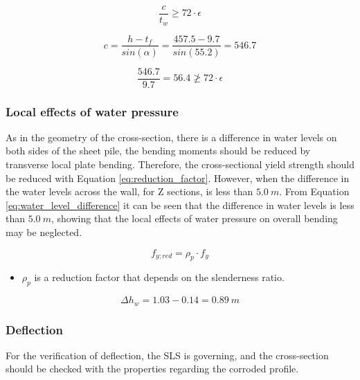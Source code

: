 \begin{equation}
    \frac{c}{t_{w}} \geq 72 \cdot \epsilon
    \label{eq:shear_buckling}
\end{equation}

\begin{equation}
    c = \frac{h - t_{f}}{sin(\alpha)} = \frac{457.5 - 9.7}{sin(55.2)} = 546.7 
\end{equation}

\begin{equation}
    \frac{546.7}{9.7} = 56.4 \ngeq 72 \cdot \epsilon 
    \label{eq:no_shear_buckling}
\end{equation}

\subsubsection{Local effects of water pressure}

As in the geometry of the cross-section, there is a difference in water levels on both sides of the sheet pile, the bending moments should be reduced by transverse local plate bending. Therefore, the cross-sectional yield strength should be reduced with Equation \ref{eq:reduction_factor}. However, when the difference in the water levels across the wall, for Z sections, is less than $5.0 \ m$. From Equation \ref{eq:water_level_difference} it can be seen that the difference in water levels is less than $5.0 \ m$, showing that the local effects of water pressure on overall bending may be neglected. 

\begin{equation}
    f_{y;red} = \rho_{p} \cdot f_{y}
    \label{eq:reduction_factor}
\end{equation}

\begin{itemize}
    \item $\rho_{p}$ is a reduction factor that depends on the slenderness ratio. 
\end{itemize}

\begin{equation}
    \Delta h_w = 1.03 - 0.14 = 0.89 \ m
    \label{eq:water_level_difference}
\end{equation}

\subsubsection{Deflection}

For the verification of deflection, the SLS is governing, and the cross-section should be checked with the properties regarding the corroded profile.

